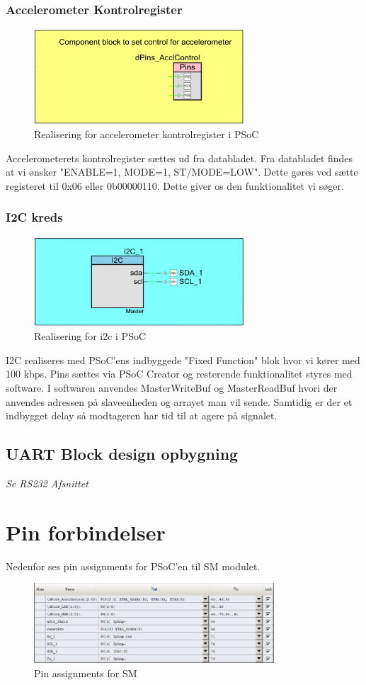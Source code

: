 \subsubsection{Accelerometer Kontrolregister}
\begin{figure}[H]
\centering
\includegraphics[width=0.7\textwidth]{billeder/Kontrolpsoc}
\caption{Realisering for accelerometer kontrolregister i PSoC}
\label{fig:SMAccReg}
\end{figure}
Accelerometerets kontrolregister sættes ud fra databladet. Fra databladet findes at vi ønsker "ENABLE=1, MODE=1, ST/MODE=LOW". Dette gøres ved sætte registeret til 0x06 eller 0b00000110. Dette giver os den funktionalitet vi søger.
\subsubsection{I2C kreds}
\begin{figure}[H]
\centering
\includegraphics[width=0.7\textwidth]{billeder/i2cpsoc}
\caption{Realisering for i2c i PSoC}
\label{fig:SMi2c}
\end{figure}
I2C realiseres med PSoC'ens indbyggede "Fixed Function" blok hvor vi kører med 100 kbps. Pins sættes via PSoC Creator og resterende funktionalitet styres med software. I softwaren anvendes MasterWriteBuf og MasterReadBuf hvori der anvendes adressen på slaveenheden og arrayet man vil sende. Samtidig er der et indbygget delay så modtageren har tid til at agere på signalet. 
\subsection{UART Block design opbygning}
\textit{Se RS232 Afsnittet}
\section{Pin forbindelser}
Nedenfor ses pin assignments for PSoC'en til SM modulet.
\begin{figure}[H]
\centering
\includegraphics[width=0.8\textwidth]{billeder/pinassignments}
\caption{Pin assignments for SM}
\label{fig:SMpin}
\end{figure}